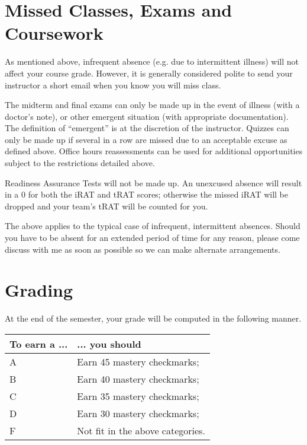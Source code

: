 \documentclass{article}
\begin{document}
\section*{\fontsize{12}{15}\selectfont Missed Classes, Exams and Coursework}

As mentioned above, infrequent absence (e.g. due to intermittent illness) will not affect your course grade.  However, it is generally considered polite to send your instructor a short email when you know you will miss class.  

The midterm and final exams can only be made up in the event of illness (with a doctor's note), or other emergent situation (with appropriate documentation).  The definition of ``emergent'' is at the discretion of the instructor. Quizzes can only be made up if several in a row are missed due to an acceptable excuse as defined above.  Office hours reassessments can be used for additional opportunities subject to the restrictions detailed above.

Readiness Assurance Tests will not be made up. An unexcused absence will result in a 0 for both the iRAT and tRAT scores; otherwise the missed iRAT will be dropped and your team's tRAT will be counted for you.   

The above applies to the typical case of infrequent, intermittent absences. Should you have to be absent for an extended period of time for any reason, please come discuss with me as soon as possible so we can make alternate arrangements.

\noindent \begin{minipage}{\textwidth}
\section*{\fontsize{12}{15}\selectfont Grading}
At the end of the semester, your grade will be computed in the following manner.  \\

\begin{center}
 \begin{tabular}{l|l} 
To earn a  ... & ... you should \\
\hline
A & Earn 45 mastery checkmarks;  \\
\hline

B &  Earn 40 mastery checkmarks; \\
\hline

C 	&Earn 35 mastery checkmarks;\\
\hline

D & Earn 30 mastery checkmarks;\\
\hline

F 	& Not fit in the above categories. \\
\hline
\end{tabular}
\end{center}
\end{minipage}
\end{document}
